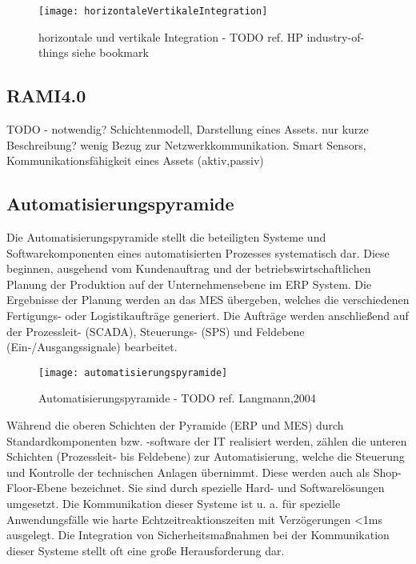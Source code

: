 \begin{figure}[h]
  \centering
  \texttt{[image: horizontaleVertikaleIntegration]}
  \caption{horizontale und vertikale Integration - TODO ref. HP industry-of-things siehe bookmark}
  \label{Kap2:horizontale und vertikale Integration}
\end{figure}

\clearpage

\subsection{\ac{RAMI4.0}}
TODO - notwendig? Schichtenmodell, Darstellung eines Assets. nur kurze Beschreibung? wenig Bezug zur Netzwerkkommunikation. Smart Sensors, Kommunikationsfähigkeit eines Assets (aktiv,passiv)

\subsection{Automatisierungspyramide}
Die Automatisierungspyramide stellt die beteiligten Systeme und Softwarekomponenten eines automatisierten Prozesses systematisch dar. Diese beginnen, ausgehend vom Kundenauftrag und der betriebswirtschaftlichen Planung der Produktion auf der Unternehmensebene im \ac{ERP} System. Die Ergebnisse der Planung werden an das \ac{MES} übergeben, welches die verschiedenen Fertigungs- oder Logistikaufträge generiert. Die Aufträge werden anschließend auf der Prozessleit- (\ac{SCADA}), Steuerungs- (\ac{SPS}) und Feldebene (Ein-/Ausgangssignale) bearbeitet.

\begin{figure}[h]
  \centering
  \texttt{[image: automatisierungspyramide]}
  \caption{Automatisierungspyramide - TODO ref. Langmann,2004}
  \label{Kap2:Automatisierungspyramide}
\end{figure}

\clearpage

Während die oberen Schichten der Pyramide (\ac{ERP} und \ac{MES}) durch Standardkomponenten bzw. -software der IT realisiert werden, zählen die unteren Schichten (Prozessleit- bis Feldebene) zur Automatisierung, welche die Steuerung und Kontrolle der technischen Anlagen übernimmt. Diese werden auch als Shop-Floor-Ebene bezeichnet. Sie sind durch spezielle Hard- und Softwarelösungen umgesetzt. Die Kommunikation dieser Systeme ist u. a. für spezielle Anwendungsfälle wie harte Echtzeitreaktionszeiten mit Verzögerungen <1ms ausgelegt. Die Integration von Sicherheitsmaßnahmen bei der Kommunikation dieser Systeme stellt oft eine große Herausforderung dar.

